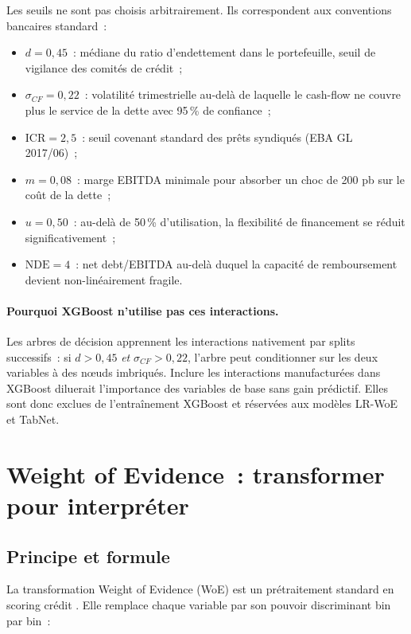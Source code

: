 \documentclass[12pt, a4paper, twoside, openright]{report}
\theoremstyle{definition}
\begin{document}
Les seuils ne sont pas choisis arbitrairement. Ils correspondent aux conventions bancaires standard~:
\begin{itemize}[nosep]
  \item $d = 0{,}45$~: médiane du ratio d'endettement dans le portefeuille, seuil de vigilance des comités de crédit~;
  \item $\sigma_{CF} = 0{,}22$~: volatilité trimestrielle au-delà de laquelle le cash-flow ne couvre plus le service de la dette avec 95\,\% de confiance~;
  \item $\text{ICR} = 2{,}5$~: seuil covenant standard des prêts syndiqués (EBA GL 2017/06)~;
  \item $m = 0{,}08$~: marge EBITDA minimale pour absorber un choc de 200 pb sur le coût de la dette~;
  \item $u = 0{,}50$~: au-delà de 50\,\% d'utilisation, la flexibilité de financement se réduit significativement~;
  \item $\text{NDE} = 4$~: net debt/EBITDA au-delà duquel la capacité de remboursement devient non-linéairement fragile.
\end{itemize}

\paragraph{Pourquoi XGBoost n'utilise pas ces interactions.} Les arbres de décision apprennent les interactions nativement par splits successifs~: si $d > 0{,}45$ \emph{et} $\sigma_{CF} > 0{,}22$, l'arbre peut conditionner sur les deux variables à des nœuds imbriqués. Inclure les interactions manufacturées dans XGBoost diluerait l'importance des variables de base sans gain prédictif. Elles sont donc exclues de l'entraînement XGBoost et réservées aux modèles LR-WoE et TabNet.

\section{Weight of Evidence~: transformer pour interpréter}
\label{sec:pd:woe}

\subsection{Principe et formule}

La transformation Weight of Evidence (WoE) est un prétraitement standard en scoring crédit \citep{siddiqi2006, anderson2007}. Elle remplace chaque variable par son pouvoir discriminant bin par bin~:
\end{document}
